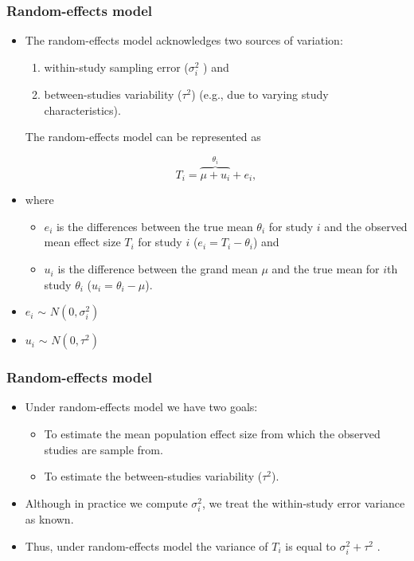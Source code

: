 \documentclass{beamer}\usepackage[]{graphicx}\usepackage[]{color}
\begin{document}
\begin{frame}
  \frametitle{Random-effects model}
  \begin{itemize}
  \item The random-effects model acknowledges two sources of variation:
    \begin{enumerate}
    \item within-study sampling error ($\sigma_{i}^2$ ) and 
    \item between-studies variability ($\tau^2$) (e.g., due to varying study characteristics).
    \end{enumerate}
    The random-effects model can be represented as
    
    \begin{equation}\label{rand}
      T_i = \overbrace{\mu + u_i}^{\theta_i} + e_i ,
    \end{equation}
    
    
  \item where
    \begin{itemize}
    \item $e_i$ is the differences between the true mean $\theta_i$ for study $i$ and the
      observed mean effect size $T_i$ for study $i$ ($e_i = T_i - \theta_i$) and 
    \item $u_i$ is the difference between the grand mean $\mu$ and the true mean
      for $i$th study $\theta_i$ ($u_i = \theta_i - \mu$).
    \end{itemize}

\item $e_i$ $\sim$ $N(0,\sigma_{i}^2)$
\item $u_i$ $\sim$ $N(0,\tau^2)$
\end{itemize}
\end{frame}



\begin{frame}
  \frametitle{Random-effects model}
  \begin{itemize}
  \item Under random-effects model we have two goals:
    \begin{itemize}
  \item To estimate the mean population effect size from which the observed studies are sample from.
  \item To estimate the between-studies variability ($\tau^2$).
\end{itemize}
  \item Although in practice we compute $\sigma_{i}^2$, we treat the within-study error variance as known.
  \item Thus, under random-effects model the variance of $T_i$ is equal to $\sigma_{i}^2 + \tau^2$ .
  \end{itemize}
\end{frame}
\end{document}
